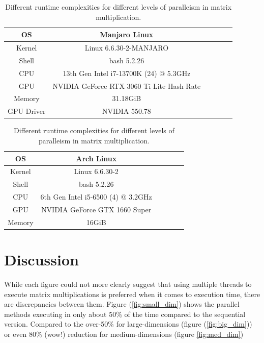 \documentclass{article}
\begin{document}
    \begin{table}[h]
        \centering
        \begin{tabular}{|c||c|c|c|c|c|}
            \hline
            OS & Manjaro Linux \\
            \hline
            Kernel & Linux 6.6.30-2-MANJARO \\
            \hline
            Shell & bash 5.2.26 \\
            \hline
            CPU & 13th Gen Intel i7-13700K (24) @ 5.3GHz \\
            \hline
            GPU & NVIDIA GeForce RTX 3060 Ti Lite Hash Rate \\
            \hline
            Memory & 31.18GiB  \\
            \hline
            GPU Driver & NVIDIA 550.78 \\
            \hline
        \end{tabular}
        \caption{Different runtime complexities for different levels of paralleism in matrix multiplication.}
        \label{tbl:homeSpecs}
    \end{table}

    \begin{table}[h]
        \centering
        \begin{tabular}{|c||c|c|c|c|c|}
            \hline
            OS & Arch Linux \\
            \hline
            Kernel & Linux 6.6.30-2 \\
            \hline
            Shell & bash 5.2.26 \\
            \hline
            CPU & 6th Gen Intel i5-6500 (4) @ 3.2GHz \\
            \hline
            GPU & NVIDIA GeForce GTX 1660 Super \\
            \hline
            Memory & 16GiB  \\
            \hline
        \end{tabular}
        \caption{Different runtime complexities for different levels of paralleism in matrix multiplication.}
        \label{tbl:officeSpecs}
    \end{table}

\section{Discussion}

    
    While each figure could not more clearly suggest that using multiple threads to execute matrix multiplications is preferred when it comes to execution time, there are discrepancies between them.  Figure (\ref{fig:small_dim}) shows the parallel methods executing in only about 50\% of the time compared to the sequential version.  Compared to the over-50\% for large-dimensions (figure (\ref{fig:big_dim})) or even 80\% (wow!) reduction for medium-dimensions (figure \ref{fig:med_dim})
\end{document}
